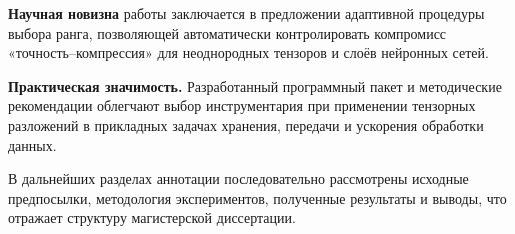 \textbf{Научная новизна} работы заключается в предложении адаптивной процедуры выбора ранга, позволяющей автоматически контролировать компромисс «точность–компрессия» для неоднородных тензоров и слоёв нейронных сетей.  

\textbf{Практическая значимость.}  
Разработанный программный пакет и методические рекомендации облегчают выбор инструментария при применении тензорных разложений в прикладных задачах хранения, передачи и ускорения обработки данных.  

В дальнейших разделах аннотации последовательно рассмотрены исходные предпосылки, методология экспериментов, полученные результаты и выводы, что отражает структуру магистерской диссертации.

